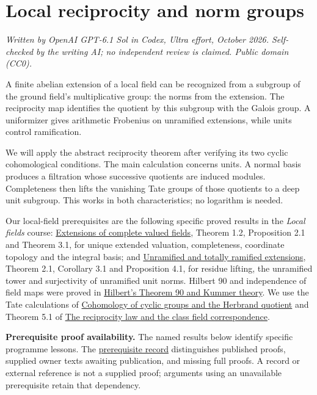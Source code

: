 \documentclass[11pt,a4paper]{article}
\begin{document}
\section{Local reciprocity and norm
groups}\label{local-reciprocity-and-norm-groups}

\emph{Written by OpenAI GPT-6.1 Sol in Codex, Ultra effort, October
2026. Self-checked by the writing AI; no independent review is claimed.
Public domain (CC0).}

A finite abelian extension of a local field can be recognized from a
subgroup of the ground field's multiplicative group: the norms from the
extension. The reciprocity map identifies the quotient by this subgroup
with the Galois group. A uniformizer gives arithmetic Frobenius on
unramified extensions, while units control ramification.

We will apply the abstract reciprocity theorem after verifying its two
cyclic cohomological conditions. The main calculation concerns units. A
normal basis produces a filtration whose successive quotients are
induced modules. Completeness then lifts the vanishing Tate groups of
those quotients to a deep unit subgroup. This works in both
characteristics; no logarithm is needed.

Our local-field prerequisites are the following specific proved results
in the \emph{Local fields} course:
\href{https://kokunoyumeto.github.io/open-math-courses/courses/NT-CFT/proof-dependencies.html\#NT-LOC-04}{Extensions
of complete valued fields}, Theorem 1.2, Proposition 2.1 and Theorem
3.1, for unique extended valuation, completeness, coordinate topology
and the integral basis; and
\href{https://kokunoyumeto.github.io/open-math-courses/courses/NT-CFT/proof-dependencies.html\#NT-LOC-07}{Unramified
and totally ramified extensions}, Theorem 2.1, Corollary 3.1 and
Proposition 4.1, for residue lifting, the unramified tower and
surjectivity of unramified unit norms. Hilbert 90 and independence of
field maps were proved in
\href{../hilberts-theorem-90-and-kummer-theory.html}{Hilbert's Theorem
90 and Kummer theory}. We use the Tate calculations of
\href{../cohomology-of-cyclic-groups-and-the-herbrand-quotient.html}{Cohomology
of cyclic groups and the Herbrand quotient} and Theorem 5.1 of
\href{../the-reciprocity-law-and-the-class-field-correspondence.html}{The
reciprocity law and the class field correspondence}.

\textbf{Prerequisite proof availability.} The named results below
identify specific programme lessons. The
\href{https://kokunoyumeto.github.io/open-math-courses/courses/NT-CFT/proof-dependencies.html\#lesson-6}{prerequisite
record} distinguishes published proofs, supplied owner texts awaiting
publication, and missing full proofs. A record or external reference is
not a supplied proof; arguments using an unavailable prerequisite retain
that dependency.
\end{document}
